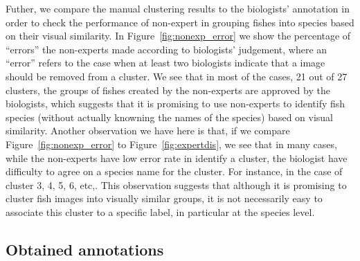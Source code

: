 Futher, we compare the manual clustering results to the biologists' annotation in order
to check the performance of non-expert in grouping fishes into species based on their visual
similarity. In Figure~\ref{fig:nonexp_error} we show the percentage of ``errors'' the non-experts
made according to biologists' judgement, where an ``error'' refers to the case when at least 
two biologists indicate that a image should be removed from a cluster. We see that in most
of the cases, 21 out of 27 clusters, the groups of fishes created by the non-experts are 
approved by the biologists, which suggests that it is promising to use non-experts to identify
fish species (without actually knowning the names of the species) based on visual similarity.
Another observation we have here is that, if we compare Figure~\ref{fig:nonexp_error} to 
Figure~\ref{fig:expertdis}, we see that in many cases, while the non-experts have low error rate
in identify a cluster, the biologist have difficulty to agree on a species name for the cluster. 
For instance, in the case of cluster 3, 4, 5, 6, etc,.
This observation suggests that although it is promising to cluster fish images into visually similar
groups, it is not necessarily easy to associate this cluster to a specific label, in particular at
the species level.   






\subsection{Obtained annotations}

